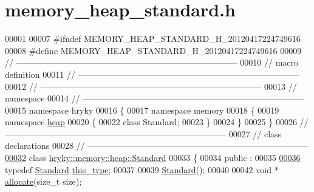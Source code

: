 \hypertarget{memory__heap__standard_8h_source}{\section{memory\-\_\-heap\-\_\-standard.\-h}
}

\begin{DoxyCode}
00001 
00007 \textcolor{preprocessor}{#ifndef MEMORY\_HEAP\_STANDARD\_H\_20120417224749616}
00008 \textcolor{preprocessor}{}\textcolor{preprocessor}{#define MEMORY\_HEAP\_STANDARD\_H\_20120417224749616}
00009 \textcolor{preprocessor}{}\textcolor{comment}{//
      ------------------------------------------------------------------------------}
00010 \textcolor{comment}{// macro definition}
00011 \textcolor{comment}{//
      ------------------------------------------------------------------------------}
00012 \textcolor{comment}{//
      ------------------------------------------------------------------------------}
00013 \textcolor{comment}{// namespace}
00014 \textcolor{comment}{//
      ------------------------------------------------------------------------------}
00015 \textcolor{keyword}{namespace }hryky
00016 \{
00017 \textcolor{keyword}{namespace }memory
00018 \{
00019 \textcolor{keyword}{namespace }\hyperlink{namespacehryky_1_1memory_1_1global_a6fc6103f67c837aa0f39b359588409cd}{heap}
00020 \{
00022     \textcolor{keyword}{class }Standard;
00023 \}
00024 \}
00025 \}
00026 \textcolor{comment}{//
      ------------------------------------------------------------------------------}
00027 \textcolor{comment}{// class declarations}
00028 \textcolor{comment}{//
      ------------------------------------------------------------------------------}
\hypertarget{memory__heap__standard_8h_source_l00032}{}\hyperlink{classhryky_1_1memory_1_1heap_1_1_standard}{00032} \textcolor{comment}{}\textcolor{keyword}{class }\hyperlink{classhryky_1_1memory_1_1heap_1_1_standard}{hryky::memory::heap::Standard}
00033 \{
00034 \textcolor{keyword}{public} :
00035 
\hypertarget{memory__heap__standard_8h_source_l00036}{}\hyperlink{classhryky_1_1memory_1_1heap_1_1_standard_a003f38bc62a4f7e24cd43a4f14722cc2}{00036}     \textcolor{keyword}{typedef} \hyperlink{classhryky_1_1memory_1_1heap_1_1_standard}{Standard} \hyperlink{classhryky_1_1memory_1_1heap_1_1_standard_a003f38bc62a4f7e24cd43a4f14722cc2}{this_type};
00037 
00039     \hyperlink{classhryky_1_1memory_1_1heap_1_1_standard_adcfec991c70fc90a1d022b79b87fedaf}{Standard}();
00040 
00042     \textcolor{keywordtype}{void} * \hyperlink{classhryky_1_1memory_1_1heap_1_1_standard_a48a73df7e7924d9ae0a840673ca900a4}{allocate}(\textcolor{keywordtype}{size\_t} size);

\end{DoxyCode}
